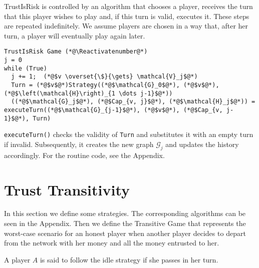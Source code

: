\documentclass[11pt]{llncs}
\makeatletter
\newcommand*\Suppressnumber{%
  \lst@AddToHook{OnNewLine}{%
    \let\thelstnumber\relax%
     \advance\c@lstnumber-\@ne\relax%
    }%
}
\theoremstyle{definition}
\makeatother
\begin{document}
     TrustIsRisk is controlled by an algorithm that chooses a player, receives the turn that
     this player wishes to play and, if this turn is valid, executes it. These steps are repeated indefinitely. We assume
     players are chosen in a way that, after her turn, a player will eventually play again later.
     \Suppressnumber
     \begin{lstlisting}[label=trustisriskgame, style=numbers]
TrustIsRisk Game (*@\Reactivatenumber@*)
j = 0
while (True)
  j += 1;  (*@$v \overset{\$}{\gets} \mathcal{V}_j$@*)
  Turn = (*@$v$@*)Strategy((*@$\mathcal{G}_0$@*), (*@$v$@*), (*@$\left(\mathcal{H}\right)_{1 \dots j-1}$@*))
  ((*@$\mathcal{G}_j$@*), (*@$Cap_{v, j}$@*), (*@$\mathcal{H}_j$@*)) = executeTurn((*@$\mathcal{G}_{j-1}$@*), (*@$v$@*), (*@$Cap_{v, j-1}$@*), Turn)
    \end{lstlisting}
     \texttt{executeTurn()} checks the validity of \texttt{Turn} and substitutes it with an empty turn if invalid.
     Subsequently, it creates the new graph $\mathcal{G}_j$ and updates the history accordingly. For the routine code,
     see the Appendix.
  \section{Trust Transitivity}
     In this section we define some strategies. The corresponding algorithms can be seen in the Appendix. Then we define the
     Transitive Game that represents the worst-case scenario for an honest player when another player decides to depart from
     the network with her money and all the money entrusted to her.
     \begin{definition}
        A player $A$ is said to follow the idle strategy if she passes in her turn. 
     \end{definition}
\end{document}
